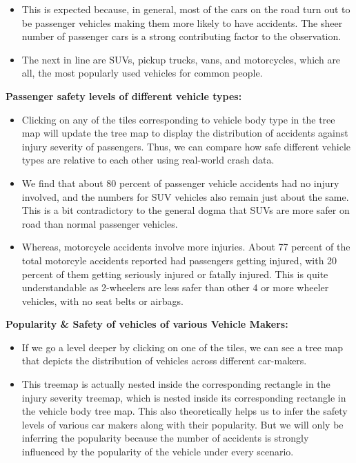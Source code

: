 \documentclass[conference]{IEEEtran}
\begin{document}
\begin{enumerate}
\begin{enumerate}
\begin{itemize}
        \item This is expected because, in general, most of the cars on the road turn out to be passenger vehicles making them more likely to have accidents. The sheer number of passenger cars is a strong contributing factor to the observation.

        \item The next in line are SUVs, pickup trucks, vans,  and motorcycles, which are all, the most popularly used vehicles for common people.
    \end{itemize}
    
    \textbf{Passenger safety levels of different vehicle types:}
    
    \begin{itemize}
    \item Clicking on any of the tiles corresponding to vehicle body type in the tree map will update the tree map to display the distribution of accidents against injury severity of passengers. Thus, we can compare how safe different vehicle types are relative to each other using real-world crash data.

    \item We find that about 80 percent of passenger vehicle accidents had no injury involved, and the numbers for SUV vehicles also remain just about the same. This is a bit contradictory to the general dogma that SUVs are more safer on road than normal passenger vehicles. 

    \item Whereas, motorcycle accidents involve more injuries. About 77 percent of the total motorcyle accidents reported had passengers getting injured, with 20 percent of them getting seriously injured or fatally injured. This is quite understandable as 2-wheelers are less safer than other 4 or more wheeler vehicles, with no seat belts or airbags. 
    \end{itemize}

    \textbf{Popularity \& Safety of vehicles of various Vehicle Makers:}
    \begin{itemize}
    \item If we go a level deeper by clicking on one of the tiles, we can see a tree map that depicts the distribution of vehicles across different car-makers.

    \item This treemap is actually nested inside the corresponding rectangle in the injury severity treemap, which is nested inside its corresponding rectangle in the vehicle body tree map. This also theoretically helps us to infer the safety levels of various car makers along with their popularity. But we will only be inferring the popularity because the number of accidents is strongly influenced by the popularity of the vehicle under every scenario. 
    

\end{itemize}
\end{enumerate}
\end{enumerate}
\end{document}
